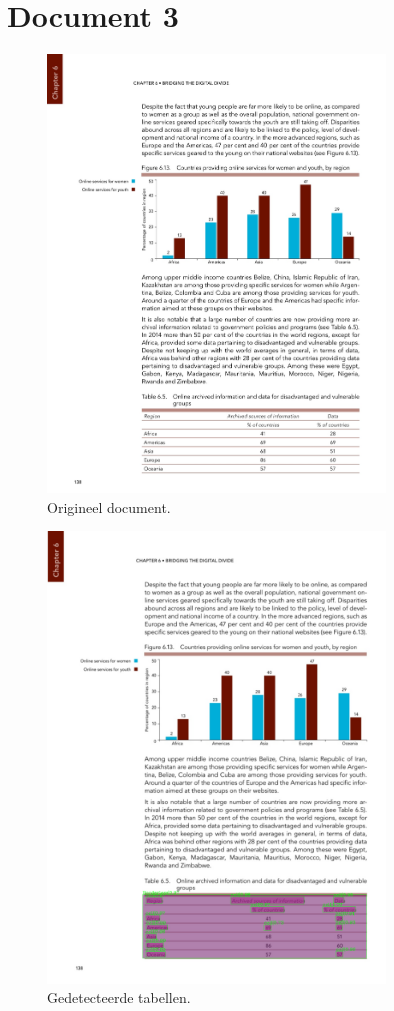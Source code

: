 \section{Document 3}

\begin{figure}[H]
    \centering
    \includegraphics[width=0.8\textwidth]{test-resultaten/3/original.jpg}
    \caption{Origineel document.}
\end{figure}

\begin{figure}[H]
    \centering
    \includegraphics[width=0.8\textwidth]{test-resultaten/3/detected_tables.png}
    \caption{Gedetecteerde tabellen.}
\end{figure}

